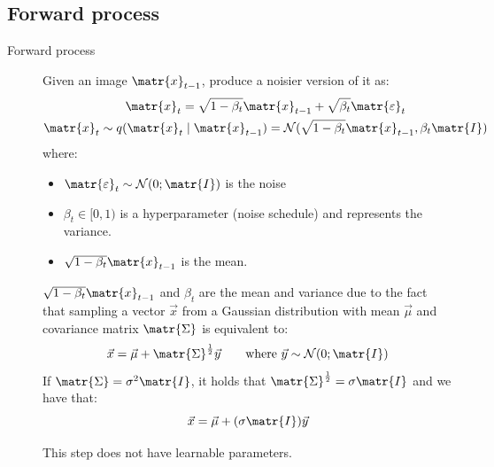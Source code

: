 \subsection{Forward process}

\begin{description}
    \item[Forward process] 
        Given an image $\matr{x}_{t-1}$, produce a noisier version of it as:
        \[ 
            \begin{gathered}
                \matr{x}_t = \sqrt{1-\beta_t} \matr{x}_{t-1} + \sqrt{\beta_t}\matr{\varepsilon}_t \\
                \matr{x}_t \sim q(\matr{x}_t \mid \matr{x}_{t-1}) = \mathcal{N}(\sqrt{1-\beta_t}\matr{x}_{t-1}, \beta_t\matr{I})
            \end{gathered}
        \]
        where:
        \begin{itemize}
            \item $\matr{\varepsilon}_t \sim \mathcal{N}(0; \matr{I})$ is the noise
            \item $\beta_t \in [0,1)$ is a hyperparameter (noise schedule) and represents the variance.
            \item $\sqrt{1-\beta_t} \matr{x}_{t-1}$ is the mean.
        \end{itemize}

        \begin{remark}
            $\sqrt{1-\beta_t} \matr{x}_{t-1}$ and $\beta_t$ are the mean and variance due to the fact that sampling a vector $\vec{x}$ from a Gaussian distribution with mean $\vec{\mu}$ and covariance matrix $\matr{\Sigma}$ is equivalent to:
            \[ \vec{x} = \vec{\mu} + \matr{\Sigma}^{\frac{1}{2}}\vec{y} \qquad \text{where } \vec{y} \sim \mathcal{N}(0; \matr{I}) \]
            If $\matr{\Sigma} = \sigma^2\matr{I}$, it holds that $\matr{\Sigma}^{\frac{1}{2}} = \sigma \matr{I}$ and we have that:
            \[ \vec{x} = \vec{\mu} + (\sigma\matr{I})\vec{y} \]
        \end{remark}

        \begin{remark}
            This step does not have learnable parameters.
        \end{remark}


\end{description}
